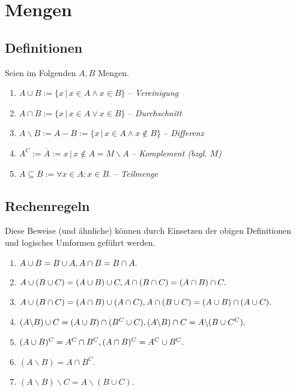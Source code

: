 \documentclass[a4paper, 9pt, DIV=24]{scrartcl}
\begin{document}
\section{Mengen}
\subsection{Definitionen}
Seien im Folgenden $A, B$ Mengen.
\begin{enumerate}[label={(}\arabic*{)}]
 \item $A \cup B := \{x\, |\, x \in A \wedge x \in B\}$ -- \emph{Vereinigung}
 \item $A \cap B := \{x\, |\, x \in A \vee x \in B\}$ -- \emph{Durchschnitt}
 \item $A \backslash B := A - B := \{x\, |\, x \in A \wedge x \notin B\}$ -- \emph{Differenz}
 \item $A^C := \overline{A} := {x\, |\, x \notin A} = M \backslash A$ -- \emph{Komplement (bzgl. $M$)}
 \item $A \subseteq B := \forall x \in A: x \in B.$ -- \emph{Teilmenge}
\end{enumerate}
\subsection{Rechenregeln}
Diese Beweise (und ähnliche) können durch Einsetzen der obigen Definitionen und logisches Umformen geführt werden.
\begin{enumerate}[label={(}\arabic*{)}]
 \item $A \cup B = B \cup A, \\ A \cap B = B \cap A.$
 \item $A \cup (B \cup C) = (A \cup B) \cup C, \\ A \cap (B \cap C) = (A \cap B) \cap C.$
 \item $A \cup (B \cap C) = (A \cap B) \cup (A \cap C), \\ A \cap (B \cup C) = (A \cup B) \cap (A \cup C).$
 \item $(A\backslash B) \cup C = (A \cup B) \cap (B^C \cup C), \\ (A\backslash B) \cap C = A \backslash (B \cup C^C).$
 \item $(A \cup B)^C = A^C \cap B^C, \\ (A \cap B)^C = A^C \cup B^C.$
 \item $(A\backslash B) = A \cap B^C.$
 \item $(A\backslash B) \backslash C = A \backslash (B \cup C).$
\end{enumerate}
\end{document}
